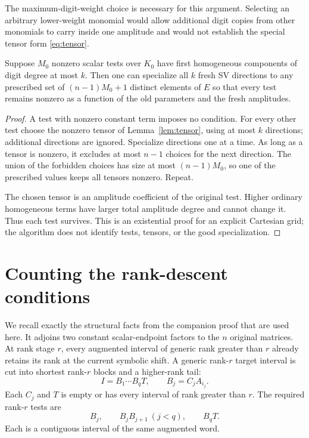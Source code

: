 The maximum-digit-weight choice is necessary for this argument.
Selecting an arbitrary lower-weight monomial would allow additional
digit copies from other monomials to carry inside one amplitude and
would not establish the special tensor form \eqref{eq:tensor}.

\begin{lemma}\label{lem:family}
Suppose $M_0$ nonzero scalar tests over $K_0$ have first homogeneous
components of digit degree at most $k$. Then one can specialize all
$k$ fresh SV directions to any prescribed set of
$(n-1)M_0+1$ distinct elements of $E$ so that every test remains
nonzero as a function of the old parameters and the fresh amplitudes.
\end{lemma}
\begin{proof}
A test with nonzero constant term imposes no condition. For every
other test choose the nonzero tensor of Lemma~\ref{lem:tensor},
using at most $k$ directions; additional directions are ignored.
Specialize directions one at a time. As long as a tensor is nonzero,
it excludes at most $n-1$ choices for the next direction. The union
of the forbidden choices has size at most $(n-1)M_0$, so one of the
prescribed values keeps all tensors nonzero. Repeat.

The chosen tensor is an amplitude coefficient of the original test.
Higher ordinary homogeneous terms have larger total amplitude degree
and cannot change it. Thus each test survives. This is an existential
proof for an explicit Cartesian grid; the algorithm does not identify
tests, tensors, or the good specialization.
\end{proof}

\section{Counting the rank-descent conditions}

We recall exactly the structural facts from the companion proof that
are used here. It adjoins two constant scalar-endpoint factors to the
$n$ original matrices. At rank stage $r$, every augmented interval
of generic rank greater than $r$ already retains its rank at the
current symbolic shift. A generic rank-$r$ target interval is cut into
shortest rank-$r$ blocks and a higher-rank tail:
\[
 I=B_1\cdots B_qT,\qquad B_j=C_jA_{i_j}.
\]
Each $C_j$ and $T$ is empty or has every interval of rank greater
than $r$. The required rank-$r$ tests are
\begin{equation}\label{eq:tests}
 B_j,\qquad B_jB_{j+1}\ (j<q),\qquad B_qT.
\end{equation}
Each is a contiguous interval of the same augmented word.

